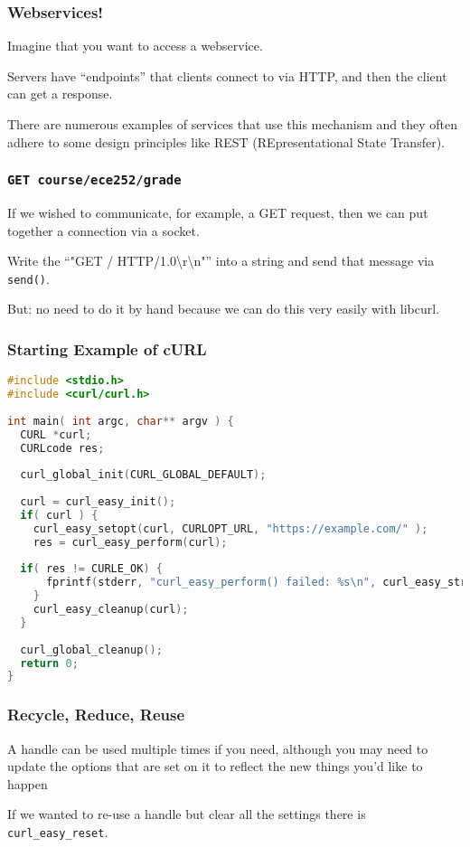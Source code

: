 \begin{frame}
	\frametitle{Webservices!}

	Imagine that you want to access a webservice.

	Servers have ``endpoints'' that clients connect to via HTTP, and then the client can get a response.

	There are numerous examples of services that use this mechanism and they often adhere to some design principles like REST (REpresentational State Transfer).

\end{frame}



\begin{frame}
	\frametitle{\texttt{GET course/ece252/grade}}

	If we wished to communicate, for example, a GET request, then we can put together a connection via a socket.

	Write the ``"GET / HTTP/1.0\textbackslash r\textbackslash n"'' into a string and send that message via \texttt{send()}.

	But: no need to do it by hand because we can do this very easily with libcurl.

\end{frame}



\begin{frame}[fragile]
	\frametitle{Starting Example of cURL}

	\begin{lstlisting}[language=C]
#include <stdio.h>
#include <curl/curl.h>
 
int main( int argc, char** argv ) {
  CURL *curl;
  CURLcode res;
 
  curl_global_init(CURL_GLOBAL_DEFAULT);
 
  curl = curl_easy_init();
  if( curl ) {
    curl_easy_setopt(curl, CURLOPT_URL, "https://example.com/" );
    res = curl_easy_perform(curl);
    
  if( res != CURLE_OK) {
      fprintf(stderr, "curl_easy_perform() failed: %s\n", curl_easy_strerror(res));
    }
    curl_easy_cleanup(curl);
  }
 
  curl_global_cleanup();
  return 0;
}
\end{lstlisting}

\end{frame}



\begin{frame}
	\frametitle{Recycle, Reduce, Reuse}

	A handle can be used multiple times if you need, although you may need to update the options that are set on it to reflect the new things you'd like to happen

	If we wanted to re-use a handle but clear all the settings there is \texttt{curl\_easy\_reset}.

\end{frame}




